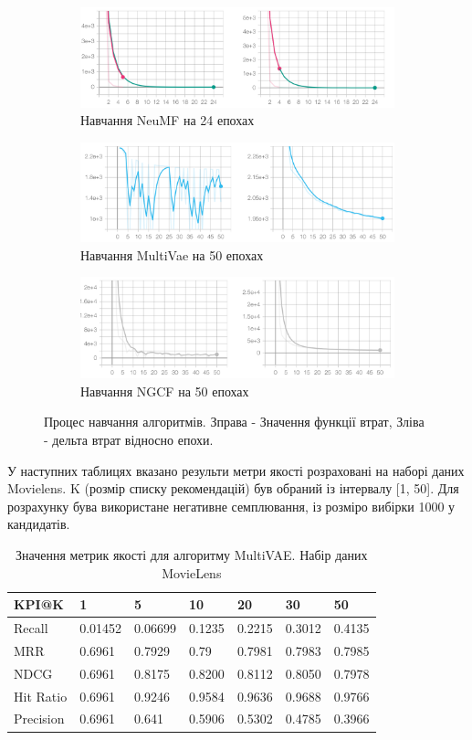 \begin{figure}
    \begin{subfigure}{\textwidth}
        \centering
        \includegraphics[width=.5\textwidth]{images/experiments/neumf_loss.png}
        \caption{Навчання NeuMF на 24 епохах}
    \end{subfigure}
    \begin{subfigure}{\textwidth}
        \centering
        \includegraphics[width=.5\textwidth]{images/experiments/multivae_loss.png}
        \caption{Навчання MultiVae на 50 епохах}
    \end{subfigure}
    \begin{subfigure}{\textwidth}
        \centering
        \includegraphics[width=.5\textwidth]{images/experiments/ngcd_loss.png}
        \caption{Навчання NGCF на 50 епохах}
    \end{subfigure}
    \caption{Процес навчання алгоритмів. Зправа - Значення функції втрат, Зліва - дельта втрат відносно епохи.}
\end{figure}
У наступних таблицях вказано результи метри якості розраховані на наборі даних Movielens.  K (розмір списку рекомендацій) був обраний із інтервалу [1, 50].
Для розрахунку бува використане негативне семплювання, із розміро вибірки 1000 у кандидатів.
\begin{table}
    \centering
    \begin{tabular}{|l|l|l|l|l|l|l|}
        \hline
        KPI@K     & 1       & 5       & 10     & 20     & 30     & 50     \\ \hline
        Recall    & 0.01452 & 0.06699 & 0.1235 & 0.2215 & 0.3012 & 0.4135 \\ \hline
        MRR       & 0.6961  & 0.7929  & 0.79   & 0.7981 & 0.7983 & 0.7985 \\ \hline
        NDCG      & 0.6961  & 0.8175  & 0.8200 & 0.8112 & 0.8050 & 0.7978 \\ \hline
        Hit Ratio & 0.6961  & 0.9246  & 0.9584 & 0.9636 & 0.9688 & 0.9766 \\ \hline
        Precision & 0.6961  & 0.641   & 0.5906 & 0.5302 & 0.4785 & 0.3966 \\ \hline
    \end{tabular}
    \caption{Значення метрик якості для алгоритму MultiVAE. Набір даних MovieLens}
\end{table}
